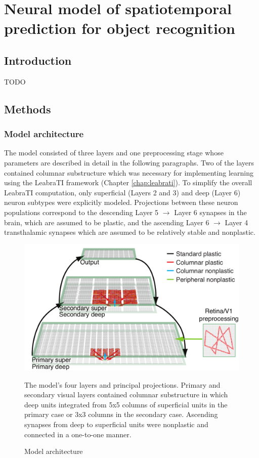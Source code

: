 \documentclass[dwyatte_dissertation.tex]{subfiles}
\begin{document}
\chapter{Neural model of spatiotemporal prediction for object recognition}

\section{Introduction}
TODO

\section{Methods}

\subsection{Model architecture}

The model consisted of three layers and one preprocessing stage whose parameters are described in detail in the following paragraphs. Two of the layers contained columnar substructure which was necessary for implementing learning using the LeabraTI framework (Chapter \ref{chap:leabrati}). To simplify the overall LeabraTI computation, only superficial (Layers 2 and 3) and deep (Layer 6) neuron subtypes were explicitly modeled. Projections between these neuron populations correspond to the descending Layer 5 $\rightarrow$ Layer 6 synapses in the brain, which are assumed to be plastic, and the ascending Layer 6 $\rightarrow$ Layer 4 transthalamic synapses which are assumed to be relatively stable and nonplastic.

\begin{figure}[h!]
\begin{center}
\includegraphics[width=160mm]{figs/chap_sims/v1_v2_output_ti_annotated.pdf}
\end{center}
\caption{Model architecture}{The model's four layers and principal projections. Primary and secondary visual layers contained columnar substructure in which deep units integrated from 5x5 columns of superficial units in the primary case or 3x3 columns in the secondary case. Ascending synapses from deep to superficial units were nonplastic and connected in a one-to-one manner.}
\label{fig:v1_v2_output}
\end{figure}
\end{document}
